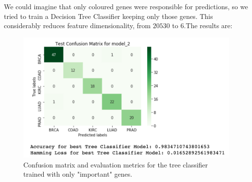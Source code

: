 \documentclass{article}
\begin{document}
We could imagine that only coloured genes were responsible for predictions, so we tried to train a Decision Tree Classifier keeping only those genes. This considerably reduces feature dimensionality, from $20530$ to $6$.The results are:

\begin{figure}[h!]
\centering
\includegraphics[width=\linewidth]{img/perm_matrix}
\caption{Confusion matrix and evaluation metrics for the tree classifier trained with only "important" genes.}
\label{fig_perm_m}
\end{figure}


\end{document}
